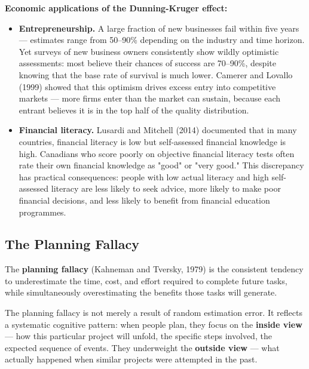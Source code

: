 \documentclass[12pt, letterpaper]{article}
\begin{document}
\textbf{Economic applications of the Dunning-Kruger effect:}

\begin{itemize}
\item \textbf{Entrepreneurship.} A large fraction of new businesses fail within five years --- estimates range from 50--90\% depending on the industry and time horizon. Yet surveys of new business owners consistently show wildly optimistic assessments: most believe their chances of success are 70--90\%, despite knowing that the base rate of survival is much lower. Camerer and Lovallo (1999) showed that this optimism drives excess entry into competitive markets --- more firms enter than the market can sustain, because each entrant believes it is in the top half of the quality distribution.
\item \textbf{Financial literacy.} Lusardi and Mitchell (2014) documented that in many countries, financial literacy is low but self-assessed financial knowledge is high. Canadians who score poorly on objective financial literacy tests often rate their own financial knowledge as "good" or "very good." This discrepancy has practical consequences: people with low actual literacy and high self-assessed literacy are less likely to seek advice, more likely to make poor financial decisions, and less likely to benefit from financial education programmes.
\end{itemize}


\subsection{The Planning Fallacy}


The \textbf{planning fallacy} (Kahneman and Tversky, 1979) is the consistent tendency to underestimate the time, cost, and effort required to complete future tasks, while simultaneously overestimating the benefits those tasks will generate.

The planning fallacy is not merely a result of random estimation error. It reflects a systematic cognitive pattern: when people plan, they focus on the \textbf{inside view} --- how this particular project will unfold, the specific steps involved, the expected sequence of events. They underweight the \textbf{outside view} --- what actually happened when similar projects were attempted in the past.
\end{document}
